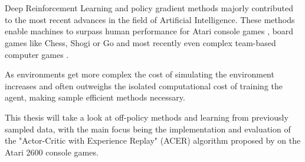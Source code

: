 \section*{}
Deep Reinforcement Learning and policy gradient methods majorly contributed to the most recent advances in the field of Artificial Intelligence.
These methods enable machines to surpass human performance for Atari console games \citep{mnih2015atari}, board games like Chess, Shogi \citep{Shogi17} or Go \citep{Go2017} and most recently even complex team-based computer games \citep{OpenAI_dota}.

As environments get more complex the cost of simulating the environment increases and often outweighs the isolated computational cost of training the agent, making sample efficient methods necessary.

This thesis will take a look at off-policy methods and learning from previously sampled data, with the main focus being the implementation and evaluation of the "Actor-Critic with Experience Replay" (ACER) algorithm proposed by \citet{ACER} on the Atari 2600 console games.
